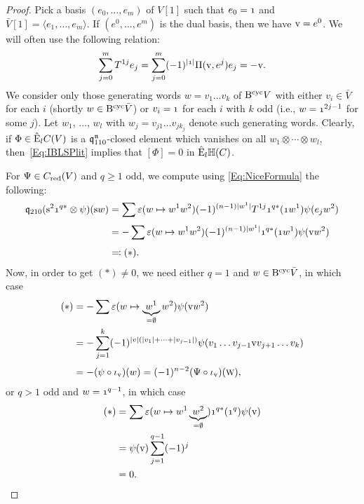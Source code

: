 \documentclass[\MainFolder/Text.tex]{subfiles}
\begin{document}
\begin{proof}
Pick a basis $(e_0, \dotsc, e_m)$ of $V[1]$ such that $e_0 = \NOne$ and $\bar{V}[1] = \langle e_1, \dotsc, e_m \rangle$. If $(e^0,\dotsc,e^m)$ is the dual basis, then we have $\mathrm{v} = e^0$. We will often use the following relation:
\begin{equation}\label{Eq:NiceFormula}
 \sum_{j=0}^m T^{1j} e_j = \sum_{j=0}^m (-1)^{\Abs{\NOne}} \Pair(\NVol,e^j) e_j =  - \NVol.
\end{equation}
We consider only those generating words $w = v_1 \dotsc v_k$ of $\mathrm{B}^{\mathrm{cyc}} V$ with either $v_i\in \bar{V}$ for each $i$ (shortly $w\in \mathrm{B}^{\mathrm{cyc}} \bar{V}$) or $v_i = \NOne$ for each $i$ with $k$ odd (i.e., $w=\NOne^{2j-1}$ for some $j$). Let $w_1$, $\dotsc$, $w_l$ with $w_j = v_{j 1} \dots v_{j k_j}$ denote such generating words. Clearly, if $\Phi \in \hat{\mathrm{E}}_l C(V)$ is a $\mathfrak{q}_{110}^{\mathfrak{n}}$-closed element which vanishes on all $w_1 \otimes \dotsb \otimes w_l$, then~\eqref{Eq:IBLSPlit} implies that $[\Phi] = 0$ in $\hat{\mathrm{E}}_l\mathbb{H}(C)$.

For $\Psi\in C_{\mathrm{red}}(V)$ and $q\ge 1$ odd, we compute using \eqref{Eq:NiceFormula} the following:
\allowdisplaybreaks
\begin{align*}
\OPQ_{210}(\Susp^2 \NOne^{q*}\otimes \psi)(\Susp w)  &= \sum \varepsilon( w\mapsto w^1 w^2)(-1)^{(n-1)\Abs{w^1}}T^{1j}\NOne^{q*}(\NOne w^1) \psi(e_j w^2) \\[\jot]
&= -\sum \varepsilon( w\mapsto w^1 w^2)(-1)^{(n-1)\Abs{w^1}}\NOne^{q*}(\NOne w^1) \psi(\NVol w^2)\\[\jot]
&\eqqcolon(*). 
\end{align*}
Now, in order to get $(*)\neq 0$, we need either $q=1$ and $w\in \mathrm{B}^{\mathrm{cyc}} \bar{V}$, in which case
\allowdisplaybreaks
\begin{align*}
 (*)&=-\sum \varepsilon(w\mapsto \underbrace{w^1}_{=\emptyset} w^2)\psi(\mathrm{v} w^2) \\ &= -\sum_{j=1}^k (-1)^{|v|(|v_1| + \dotsb + |v_{j-1}|)} \psi(v_1 \dotsc v_{j-1} \mathrm{v} v_{j+1}\dotsc v_k) \\[\jot]
 &=  - (\psi \circ \iota_{\mathrm{v}})(w) = (-1)^{n-2} (\Psi \circ \iota_{\mathrm{v}})(\text{\footnotesize W}),
\end{align*}
or $q>1$ odd and $w = \NOne^{q-1}$, in which case
\allowdisplaybreaks
\begin{align*}
 (*) &= \sum \varepsilon(w\mapsto w^1 \underbrace{w^2}_{=\emptyset}) \NOne^{q*}(\NOne^q) \psi(\NVol) \\
 &= \psi(\NVol) \sum_{j=1}^{q-1} (-1)^j \\
 & = 0.
\end{align*}


\end{proof}
\end{document}
